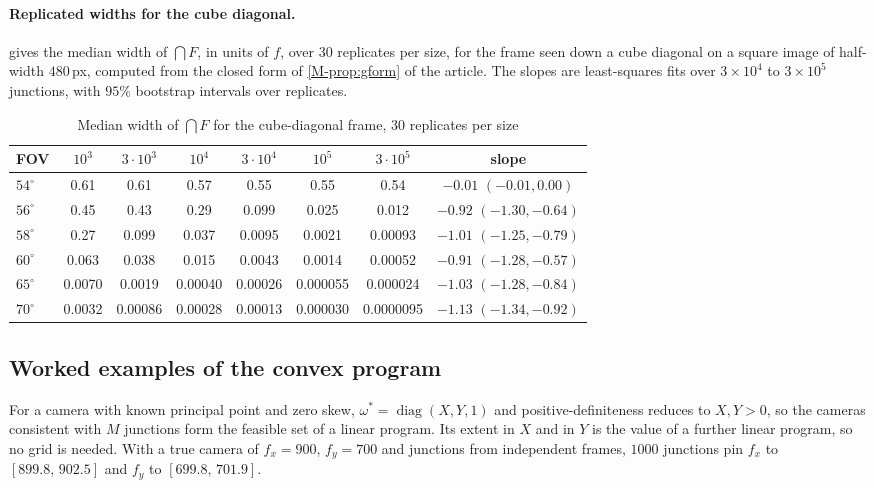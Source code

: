 \paragraph{Replicated widths for the cube diagonal.}  gives the median width of $\bigcap F$, in units of $f$, over $30$ replicates per size, for the frame seen down a cube diagonal on a square image of half-width $480$\,px, computed from the closed form of \cref{M-prop:gform} of the article. The slopes are least-squares fits over $3\times10^4$ to $3\times10^5$ junctions, with $95\%$ bootstrap intervals over replicates.

\begin{table}[h]
\centering\footnotesize
\caption{Median width of $\bigcap F$ for the cube-diagonal frame, $30$ replicates per size}
\label{tab:Stransition}
\begin{tabular}{lccccccc}
\toprule
FOV & $10^3$ & $3\cdot10^3$ & $10^4$ & $3\cdot10^4$ & $10^5$ & $3\cdot10^5$ & slope\\
\midrule
$54^\circ$ & 0.61 & 0.61 & 0.57 & 0.55 & 0.55 & 0.54 & $-0.01$ $(-0.01,0.00)$\\
$56^\circ$ & 0.45 & 0.43 & 0.29 & 0.099 & 0.025 & 0.012 & $-0.92$ $(-1.30,-0.64)$\\
$58^\circ$ & 0.27 & 0.099 & 0.037 & 0.0095 & 0.0021 & 0.00093 & $-1.01$ $(-1.25,-0.79)$\\
$60^\circ$ & 0.063 & 0.038 & 0.015 & 0.0043 & 0.0014 & 0.00052 & $-0.91$ $(-1.28,-0.57)$\\
$65^\circ$ & 0.0070 & 0.0019 & 0.00040 & 0.00026 & 0.000055 & 0.000024 & $-1.03$ $(-1.28,-0.84)$\\
$70^\circ$ & 0.0032 & 0.00086 & 0.00028 & 0.00013 & 0.000030 & 0.0000095 & $-1.13$ $(-1.34,-0.92)$\\
\bottomrule
\end{tabular}
\end{table}

\subsection{Worked examples of the convex program}\label{sec:Sprogram}

For a camera with known principal point and zero skew, $\omega^{*}=\operatorname{diag}(X,Y,1)$ and positive-definiteness reduces to $X,Y>0$, so the cameras consistent with $M$ junctions form the feasible set of a linear program. Its extent in $X$ and in $Y$ is the value of a further linear program, so no grid is needed. With a true camera of $f_x=900$, $f_y=700$ and junctions from independent frames, $1000$ junctions pin $f_x$ to $[899.8,\,902.5]$ and $f_y$ to $[699.8,\,701.9]$.

